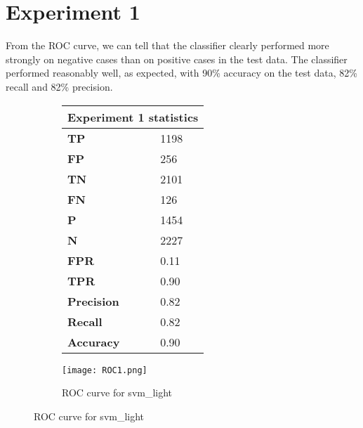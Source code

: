\documentclass[titlepage,11pt]{article}
\begin{document}
\section[4]{Experiment 1} {

\vspace{2pt}\hspace{2pt}From the ROC curve, we can tell that the classifier clearly performed more strongly on negative cases than on positive cases in the test data. The classifier performed reasonably well, as expected, with 90\% accuracy on the test data, 82\% recall and 82\% precision.\\
\vspace{0.5pt}
\begin{figure}[h]
\centering
    \begin{subfigure}[h]{0.4\textwidth}
        \centering
        \begin{tabular}{|l|l|}
        \hline
        \multicolumn{2}{|c|}{\textbf{Experiment 1 statistics}} \\
        \hline
        \textbf{ TP } & 1198 \\
        \textbf{ FP } & 256 \\
        \textbf{ TN } & 2101 \\
        \textbf{ FN } & 126 \\
        \textbf{ P } &  1454 \\
        \textbf{ N } & 2227 \\
        \textbf{ FPR } & 0.11 \\
        \textbf{ TPR } & 0.90 \\
        \hline
        \textbf{ Precision } & 0.82 \\
        \textbf{ Recall    } & 0.82 \\
        \textbf{ Accuracy  } & 0.90 \\
        \hline
        \end{tabular}
    \end{subfigure}
    \begin{subfigure}[h]{0.4\textwidth}
        \centering
        \texttt{[image: ROC1.png]}
        \caption{ROC curve for svm\_light}
    \end{subfigure}
\end{figure}
    
}

\pagebreak
\end{document}
